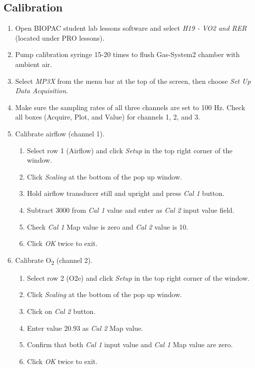 \documentclass{article}
\begin{document}
\subsection*{Calibration}
\begin{enumerate}
	\item Open BIOPAC student lab lessons software and select \textit{H19 - VO2 and RER} (located under PRO lessons).
	\item Pump calibration syringe 15-20 times to flush Gas-System2 chamber with ambient air.
	\item Select \textit{MP3X} from the menu bar at the top of the screen, then choose \textit{Set Up Data Acquisition}.
	\item Make sure the sampling rates of all three channels are set to 100 Hz. Check all boxes (Acquire, Plot, and Value) for channels 1, 2, and 3. 
	
	\item Calibrate airflow (channel 1).\begin{enumerate}
	\item Select row 1 (Airflow) and click \textit{Setup} in the top right corner of the window.
	\item Click \textit{Scaling} at the bottom of the pop up window.
	\item Hold airflow transducer still and upright and press \textit{Cal 1} button.
	\item Subtract 3000 from \textit{Cal 1} value and enter as \textit{Cal 2} input value field.
	\item Check \textit{Cal 1} Map value is zero and \textit{Cal 2} value is 10.
	\item Click \textit{OK} twice to exit.
	\end{enumerate}
	
	\item Calibrate O\textsubscript{2} (channel 2).
	\begin{enumerate}
		\item Select row 2 (O2e) and click \textit{Setup} in the top right corner of the window.
	\item Click \textit{Scaling} at the bottom of the pop up window.
	\item Click on \textit{Cal 2} button.
		\item Enter value 20.93 as \textit{Cal 2} Map value.
		\item Confirm that both \textit{Cal 1} input value and \textit{Cal 1} Map value are zero.
	\item Click \textit{OK} twice to exit.
	\end{enumerate}
	

\end{enumerate}
\end{document}
